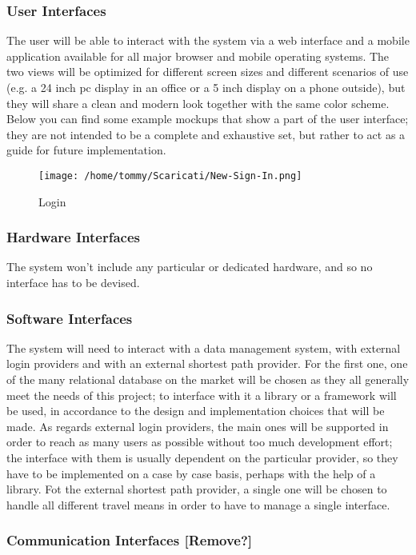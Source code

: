 \subsubsection{User Interfaces}

The user will be able to interact with the system via a web interface and a mobile application available for all major browser and mobile operating systems. The two views will be optimized for different screen sizes and different scenarios of use (e.g. a 24 inch pc display in an office or a 5 inch display on a phone outside), but they will share a clean and modern look together with the same color scheme.
\\ [0.2 cm]
Below you can find some example mockups that show a part of the user interface; they are not intended to be a complete and exhaustive set, but rather to act as a guide for future implementation.
\\ [0.5 cm]

\begin{figure}[!h]
\centering\texttt{[image: /home/tommy/Scaricati/New-Sign-In.png]}{}
\caption{Login}
\end{figure}

\subsubsection{Hardware Interfaces}

The system won't include any particular or dedicated hardware, and so no interface has to be devised.

\subsubsection{Software Interfaces}

The system will need to interact with a data management system, with external login providers and with an external shortest path provider.
For the first one, one of the many relational database on the market will be chosen as they all generally meet the needs of this project; to interface with it a library or a framework will be used, in accordance to the design and implementation choices that will be made.
As regards external login providers, the main ones will be supported in order to reach as many users as possible without too much development effort; the interface with them is usually dependent on the particular provider, so they have to be implemented on a case by case basis, perhaps with the help of a library.
Fot the external shortest path provider, a single one will be chosen to handle all different travel means in order to have to manage a single interface.

\subsubsection{Communication Interfaces [Remove?]}
